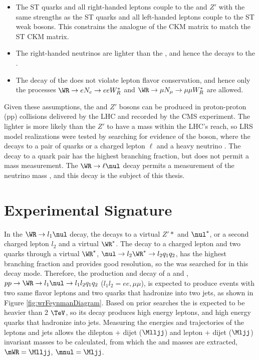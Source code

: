 \begin{itemize}
	\item The ST quarks and all right-handed leptons couple to the \WR and $Z'$ with the same strengths 
		as the ST quarks and all left-handed leptons couple to the ST weak bosons.  This constrains the 
		\WR analogue of the CKM matrix to match the ST CKM matrix.
	\item The right-handed neutrinos \nul are lighter than the \WR, and hence the \WR decays to the \nul.
	\item The decay of the \nul does not violate lepton flavor conservation, and hence only the processes 
		$\WR \rightarrow eN_{e} \rightarrow eeW^{*}_{R}$ and $\WR \rightarrow \mu N_{\mu} \rightarrow \mu\mu W^{*}_{R}$ are allowed.
\end{itemize}
Given these assumptions, the \WR and $Z'$ bosons can be produced in proton-proton (pp) collisions delivered by 
the LHC and recorded by the CMS experiment.  The lighter \WR is more likely than the $Z'$ to have a mass within 
the LHC's reach, so LRS model realizations were tested by searching for evidence of the \WR boson, where the \WR 
decays to a pair of quarks or a charged lepton $\ell$ and a heavy neutrino \nul.  The \WR decay to a quark pair 
has the highest branching fraction, but does not permit a \nul mass measurement.  The $\WR \rightarrow \ell\nul$ 
decay permits a measurement of the neutrino mass \mnul, and this decay is the subject of this thesis.


\section{Experimental Signature}
\label{sec:lrsExpSignature}
In the $\WR \rightarrow l_{1}\nul$ decay, the \nul decays to a virtual $Z'*$ and $\nul^{*}$, or a second 
charged lepton $l_{2}$ and a virtual $\WR^{*}$.  The \nul decay to a charged lepton and two quarks through a 
virtual $\WR^{*}$, $\nul \rightarrow l_{2}\WR^{*} \rightarrow l_{2}q_{1}q_{2}$, has the highest branching fraction 
and provides good \mnul resolution, so the \nul was searched for in this decay mode.  Therefore, the production 
and decay of a \WR and \nul,$pp \rightarrow \WR \rightarrow l_{1}\nul \rightarrow l_{1}l_{2}q_{1}q_{2}$ ($l_{1}l_{2} = ee,\mu\mu$), 
is expected to produce events with two same flavor leptons and two quarks that hadronize into two jets, as shown 
in Figure \ref{fig:wrFeynmanDiagram}.  Based on prior searches \cite{cmsWRRunOneResults} the \WR is expected to 
be heavier than 2 $\TeV$, so its decay produces high energy leptons, and high energy quarks that hadronize into jets.  
Measuring the energies and trajectories of the leptons and jets allows the dilepton $\plus$ dijet ($\Mlljj$) 
and lepton $\plus$ dijet ($\Mljj$) invariant masses to be calculated, from which the \WR and \nul masses are 
extracted, $\mWR = \Mlljj$, $\mnul = \Mljj$.

